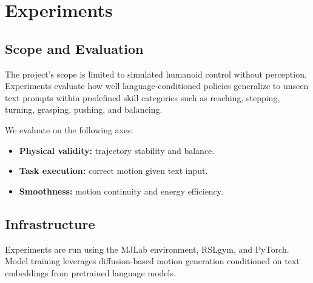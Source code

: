 \section{Experiments}
\label{sec:experiments}

\subsection{Scope and Evaluation}

The project’s scope is limited to simulated humanoid control without perception.
Experiments evaluate how well language-conditioned policies generalize to unseen text prompts within predefined skill categories such as reaching, stepping, turning, grasping, pushing, and balancing.

We evaluate on the following axes:
\begin{itemize}
    \item \textbf{Physical validity:} trajectory stability and balance.
    \item \textbf{Task execution:} correct motion given text input.
    \item \textbf{Smoothness:} motion continuity and energy efficiency.
\end{itemize}

\subsection{Infrastructure}

Experiments are run using the MJLab environment, RSLgym, and PyTorch.
Model training leverages diffusion-based motion generation conditioned on text embeddings from pretrained language models.